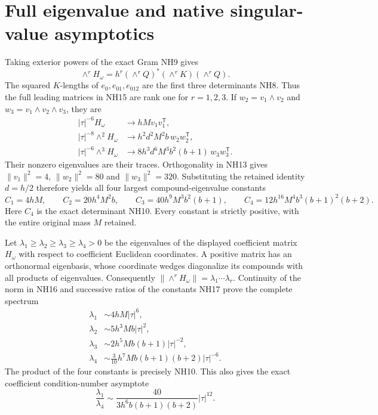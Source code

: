 \section{Full eigenvalue and native singular-value asymptotics}
Taking exterior powers of the exact Gram NH9 gives
\[
 \wedge^rH_\omega
 =h^r(\wedge^rQ)^*(\wedge^rK)(\wedge^rQ).
 \tag{NH15}
\]
The squared $K$-lengths of $e_0,e_{01},e_{012}$ are the first
three determinants NH8. Thus the full leading matrices in
NH15 are rank one for $r=1,2,3$. If $w_2=v_1\wedge v_2$
and $w_3=v_1\wedge v_2\wedge v_3$, they are
\[
\begin{aligned}
 |\tau|^{-6}H_\omega&\longrightarrow hM v_1v_1^{\mathsf T},\\
 |\tau|^{-8}\wedge^2H_\omega&\longrightarrow
              h^2d^2M^2b\,w_2w_2^{\mathsf T},\\
 |\tau|^{-6}\wedge^3H_\omega&\longrightarrow
              8h^3d^6M^3b^2(b+1)\,w_3w_3^{\mathsf T}.
\end{aligned}\tag{NH16}
\]
Their nonzero eigenvalues are their traces. Orthogonality in
NH13 gives $\|v_1\|^2=4$, $\|w_2\|^2=80$ and
$\|w_3\|^2=320$. Substituting the retained identity $d=h/2$
therefore yields all four largest compound-eigenvalue constants
\[
 C_1=4hM,\qquad C_2=20h^4M^2b,\qquad
 C_3=40h^9M^3b^2(b+1),\qquad
 C_4=12h^{16}M^4b^3(b+1)^2(b+2).
 \tag{NH17}
\]
Here $C_4$ is the exact determinant NH10. Every constant is
strictly positive, with the entire original mass $M$ retained.

Let $\lambda_1\ge\lambda_2\ge\lambda_3\ge\lambda_4>0$
be the eigenvalues of the displayed coefficient matrix $H_\omega$
with respect to coefficient Euclidean coordinates. A positive
matrix has an orthonormal eigenbasis, whose coordinate wedges
diagonalize its compounds with all products of eigenvalues.
Consequently $\|\wedge^rH_\omega\|=\lambda_1\cdots\lambda_r$.
Continuity of the norm in NH16 and successive ratios of the
constants NH17 prove the complete spectrum
\[
\boxed{\begin{aligned}
 \lambda_1&\sim4hM|\tau|^6,\\
 \lambda_2&\sim5h^3Mb|\tau|^2,\\
 \lambda_3&\sim2h^5Mb(b+1)|\tau|^{-2},\\
 \lambda_4&\sim\tfrac3{10}h^7Mb(b+1)(b+2)|\tau|^{-6}.
\end{aligned}}\tag{NH18}
\]
The product of the four constants is precisely NH10. This
also gives the exact coefficient condition-number asymptote
\[
 \frac{\lambda_1}{\lambda_4}
 \sim\frac{40}{3h^6b(b+1)(b+2)}|\tau|^{12}.
 \tag{NH19}
\]

